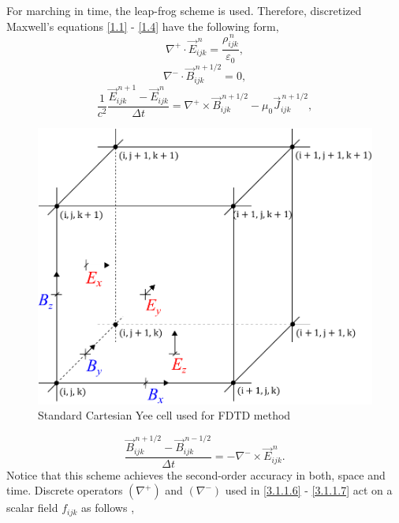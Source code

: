 For marching in time, the leap-frog scheme is used. Therefore, discretized Maxwell's equations \ref{1.1} - \ref{1.4} have the following form,
\begin{equation}
\label{3.1.1.6}
\nabla^{+} \cdot \vec{E}_{ijk}^{\,n} = \frac{\rho_{ijk}^{\,n}}{\varepsilon_0},
\end{equation}
\begin{equation}
\label{3.1.1.15}
\nabla^{-} \cdot \vec{B}_{ijk}^{\,n + 1/2} = 0,
\end{equation}
\begin{equation}
\label{3.1.1.16}
\frac{1}{c^{2}} \frac{\vec{E}_{ijk}^{\,n + 1} - \vec{E}_{ijk}^{\,n}}{\Delta t} = \nabla^{+} \times \vec{B}_{ijk}^{\,n + 1/2} - \mu_{0} \vec{J}_{ijk}^{\,n + 1/2},
\end{equation}
\begin{figure}[t]
	\centering
	\includegraphics[width=0.4\paperwidth]{./img/yee/yee.pdf}
	\caption{Standard Cartesian Yee cell used for FDTD method}
	\label{3.1.1.14}
\end{figure}
\begin{equation}
\label{3.1.1.7}
\frac{\vec{B}_{ijk}^{\,n + 1/2} - \vec{B}_{ijk}^{\,n - 1/2}}{\Delta t} = -\nabla^{-} \times \vec{E}_{ijk}^{\,n}.
\end{equation}
Notice that this scheme achieves the second-order accuracy in both, space and time. Discrete operators $ \left(\nabla^{+}\right) $ and $ \left(\nabla^{-}\right) $ used in \ref{3.1.1.6} - \ref{3.1.1.7} act on a scalar field $ f_{i j k} $ as follows \cite{esirkepov},
